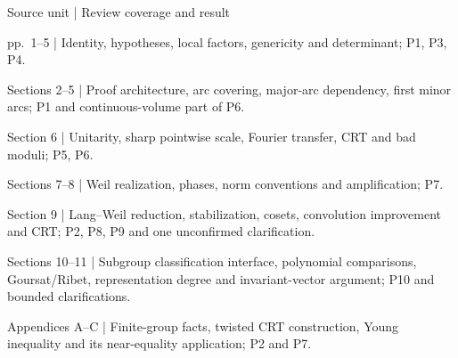\documentclass[10pt]{article}
\begin{document}
Source unit | Review coverage and result\par
pp. 1–5 | Identity, hypotheses, local factors, genericity and determinant; P1, P3, P4.\par
Sections 2–5 | Proof architecture, arc covering, major-arc dependency, first minor arcs; P1 and continuous-volume part of P6.\par
Section 6 | Unitarity, sharp pointwise scale, Fourier transfer, CRT and bad moduli; P5, P6.\par
Sections 7–8 | Weil realization, phases, norm conventions and amplification; P7.\par
Section 9 | Lang–Weil reduction, stabilization, cosets, convolution improvement and CRT; P2, P8, P9 and one unconfirmed clarification.\par
Sections 10–11 | Subgroup classification interface, polynomial comparisons, Goursat/Ribet, representation degree and invariant-vector argument; P10 and bounded clarifications.\par
Appendices A–C | Finite-group facts, twisted CRT construction, Young inequality and its near-equality application; P2 and P7.\par
\end{document}
